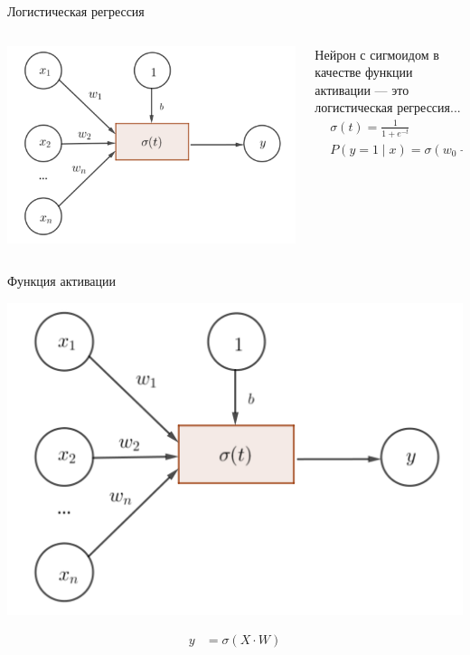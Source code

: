 \documentclass[notes,12pt, aspectratio=169]{beamer}
\begin{document}
\begin{frame}{Логистическая регрессия}
\begin{columns}[T]
	\begin{column}{.45\textwidth}
		\begin{center}
			\includegraphics[width=0.99\linewidth]{neuron_3.png}
		\end{center}
	\end{column}%
	\hfill%
	\begin{column}{.55\textwidth}
%

		Нейрон с сигмоидом в качестве функции активации — это логистическая регрессия...
		\begin{equation*}
		\begin{aligned}
		& \sigma(t) = \frac{1}{1 + e^{-t}} \\
		& P(y = 1 \mid x) = \sigma(w_0 + w_1 \cdot x_1 + \ldots + w_n \cdot  x_n) \\
		\end{aligned}
		\end{equation*}
	\end{column}%
\end{columns}
\end{frame}


\begin{frame}{Функция активации}
	\begin{center}
		\includegraphics[width=0.51\linewidth]{neuron_3.png}
	\end{center}
	\begin{equation*}
		\begin{aligned}
		y &= \sigma(X \cdot W) \\
		\end{aligned}
	\end{equation*}
\end{frame}
\end{document}
